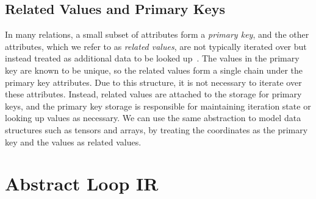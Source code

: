 \documentclass[acmsmall,screen,nonacm]{acmart}\settopmatter{printfolios=true,printccs=false,printacmref=false}
\begin{document}
\subsection{Related Values and Primary Keys}
In many relations, a small subset of attributes form a \emph{primary key}, and the other attributes, which we refer to as \emph{related values}, are not typically iterated over but instead treated as additional data to be looked up~\cite{dbs-complete-book}. The values in the primary key are known to be unique, so the related values form a single chain under the primary key attributes. Due to this structure, it is not necessary to iterate over these attributes. Instead, related values are attached to the storage for primary keys, and the primary key storage is responsible for maintaining iteration state or looking up values as necessary.
We can use the same abstraction to model data structures such as tensors and arrays, by treating the coordinates as the primary key and the values as related values.


\section{Abstract Loop IR}
\label{sec:abstract-loops}
\end{document}
